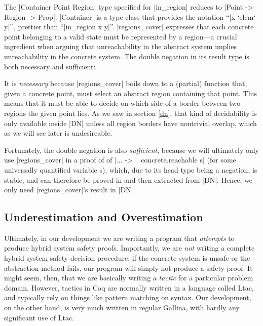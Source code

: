 \documentclass[runningheads]{llncs}
\begin{document}
The |Container Point Region| type specified for |in_region| reduces to
|Point -> Region -> Prop|. |Container| is a type class that provides
the notation ``|x `elem` y|'', prettier than ``|in_region x
y|''. |regions_cover| expresses that each concrete point belonging to
a valid state must be represented by a region---a crucial ingredient
when arguing that unreachability in the abstract system implies
unreachability in the concrete system. The double negation in its
result type is both necessary and sufficient:

It is \emph{necessary} because |regions_cover| boils down to a
(partial) function that, given a concrete point, must select an
abstract region containing that point. This means that it must be able
to decide on which side of a border between two regions the given
point lies. As we saw in section \ref{dn}, that kind of decidability
is only available inside |DN| unless all region borders have
nontrivial overlap, which as we will see later is undesireable.

Fortunately, the double negation is also \emph{sufficient}, because we
will ultimately only use |regions_cover| in a proof of of |... -> ~
concrete.reachable s| (for some universally quantified variable s),
which, due to its head type being a negation, is stable, and can
therefore be proved in and then extracted from |DN|. Hence, we only
need |regions_cover|'s result in |DN|.

\subsection{Underestimation and Overestimation}
\label{estimation}

Ultimately, in our development we are writing a program that
\emph{attempts} to produce hybrid system safety proofs. Importantly,
we are \emph{not} writing a complete hybrid system safety decision
procedure: if the concrete system is unsafe or the abstraction method
fails, our program will simply not produce a safety proof. It might
seem, then, that we are basically writing a \emph{tactic} for a
particular problem domain. However, tactics in Coq are normally
written in a language called Ltac, and typically rely on things like
pattern matching on syntax. Our development, on the other hand, is
very much written in regular Gallina, with hardly any significant use
of Ltac. 
\end{document}
